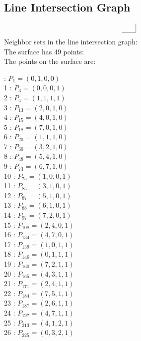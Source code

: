 \documentclass{article}
\begin{document}
{\subsection*{Line Intersection Graph}
{\arraycolsep=1pt
$$
\begin{array}{rr|*{0}r}
 & \\
\hline
\end{array}
$$
}%
Neighbor sets in the line intersection graph:\\
The surface has 49 points:\\
The points on the surface are:\\
\begin{multicols}{3}
 : $P_{1}=( 0, 1, 0, 0 )$\\
1 : $P_{3}=( 0, 0, 0, 1 )$\\
2 : $P_{4}=( 1, 1, 1, 1 )$\\
3 : $P_{13}=( 2, 0, 1, 0 )$\\
4 : $P_{15}=( 4, 0, 1, 0 )$\\
5 : $P_{18}=( 7, 0, 1, 0 )$\\
6 : $P_{20}=( 1, 1, 1, 0 )$\\
7 : $P_{30}=( 3, 2, 1, 0 )$\\
8 : $P_{48}=( 5, 4, 1, 0 )$\\
9 : $P_{73}=( 6, 7, 1, 0 )$\\
10 : $P_{75}=( 1, 0, 0, 1 )$\\
11 : $P_{85}=( 3, 1, 0, 1 )$\\
12 : $P_{87}=( 5, 1, 0, 1 )$\\
13 : $P_{88}=( 6, 1, 0, 1 )$\\
14 : $P_{97}=( 7, 2, 0, 1 )$\\
15 : $P_{108}=( 2, 4, 0, 1 )$\\
16 : $P_{134}=( 4, 7, 0, 1 )$\\
17 : $P_{139}=( 1, 0, 1, 1 )$\\
18 : $P_{146}=( 0, 1, 1, 1 )$\\
19 : $P_{160}=( 7, 2, 1, 1 )$\\
20 : $P_{165}=( 4, 3, 1, 1 )$\\
21 : $P_{171}=( 2, 4, 1, 1 )$\\
22 : $P_{184}=( 7, 5, 1, 1 )$\\
23 : $P_{187}=( 2, 6, 1, 1 )$\\
24 : $P_{197}=( 4, 7, 1, 1 )$\\
25 : $P_{213}=( 4, 1, 2, 1 )$\\
26 : $P_{225}=( 0, 3, 2, 1 )$\\

\end{multicols}}
\end{document}

